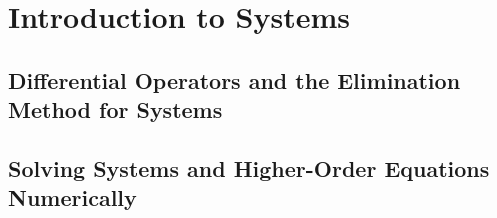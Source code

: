 \documentclass[../diffeq.tex]{subfiles}
\begin{document}
\chapter{Introduction to Systems}
\section{Differential Operators and the Elimination Method for Systems}
\section{Solving Systems and Higher-Order Equations Numerically}
\end{document}
